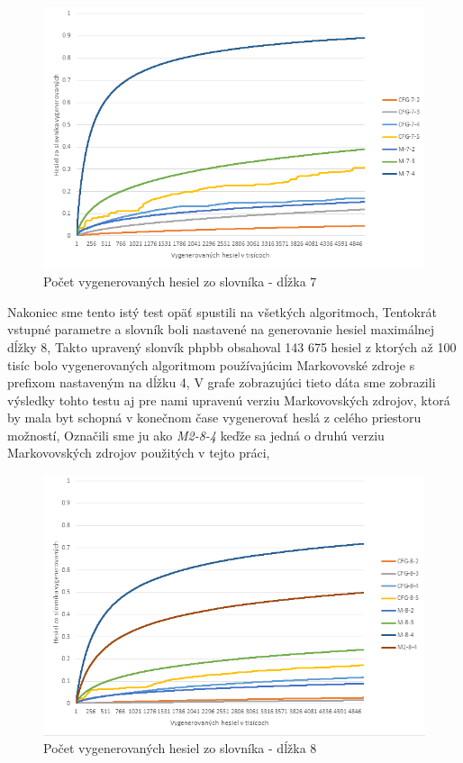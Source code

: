 \begin{figure}[ht]
    \centering
    \includegraphics[width=1\textwidth]{sameDictAcc7}
    \caption{Počet vygenerovaných hesiel zo slovníka - dĺžka 7}
    \label{fig:Acc7}
\end{figure}

Nakoniec sme tento istý test opäť spustili na všetkých algoritmoch, Tentokrát vstupné parametre a slovník boli nastavené na generovanie hesiel maximálnej dĺžky 8, Takto upravený slonvík phpbb obsahoval 143 675 hesiel z ktorých až 100 tisíc bolo vygenerovaných algoritmom používajúcim Markovovské zdroje s prefixom nastaveným na dĺžku 4, V grafe zobrazujúci tieto dáta sme zobrazili výsledky tohto testu aj pre nami upravenú verziu Markovovských zdrojov, ktorá by mala byt schopná v konečnom čase vygenerovať heslá z celého priestoru možností, Označili sme ju ako \emph{M2-8-4} keďže sa jedná o druhú verziu Markovovských zdrojov použitých v tejto práci,

\begin{figure}[ht]
    \centering
    \includegraphics[width=1\textwidth]{sameDictAcc8}
    \caption{Počet vygenerovaných hesiel zo slovníka - dĺžka 8}
    \label{fig:Acc8}
\end{figure}

